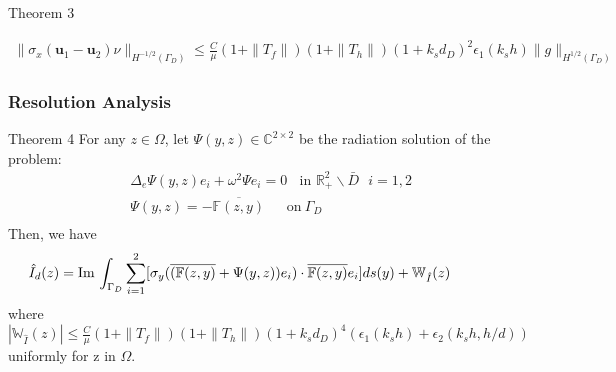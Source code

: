 \documentclass[cjk,8pt]{beamer}
\newcommand{\R}{\mathbb{R}}
\renewcommand{\Im}{\mathrm{Im}\,}
\newcommand{\Ga}{\Gamma}
\newcommand{\Om}{\Omega}
\newcommand{\bks}{\backslash}
\renewcommand{\u}{\mathbf{u}}
\newcommand{\C}{{\mathbb{C}}}
\renewcommand{\Im}{\mathrm{Im}\,}
\newcommand{\F}{\mathbb{F}}
\newcommand{\W}{\mathbb{W}}
\newcommand{\be}{\begin{eqnarray}}
\newcommand{\ee}{\end{eqnarray}}
\newcommand{\ben}{\begin{eqnarray*}}
\newcommand{\een}{\end{eqnarray*}}
\begin{document}
\begin{CJK*}{GBK}{kai}
\begin{frame}
\begin{block}{Theorem 3}
    \begin{small}
	\ben
	\|\sigma_x(\u_1-\u_2)\nu\|_{H^{-1/2}(\Gamma_D)}
	\leq \frac{C}{\mu}(1+\|T_f\|)(1+\|T_h\|)(1+k_s d_D)^2\epsilon_1(k_s h)\|g\|_{ H^{1/2}(\Ga_D)}
	\een
    \end{small}
\end{block}

\end{frame}

\begin{frame}
\frametitle{Resolution Analysis}
\begin{block}{Theorem 4}
	For any $z\in\Omega$, let $\Psi(y,z)\in\C^{2\times2}$ be the radiation solution of the problem:
	\ben
	& & \Delta_e \Psi(y,z)e_i + \omega^2\Psi e_i= 0 \ \ \ \ \mbox{in }\R_+^2\bks \bar{D} \ \ \ i=1,2 \\
	& &\Psi(y,z)= -\overline{\F(z,y)} \ \ \ \ \ \ \ \mbox{on} \ \Ga_D  \\
	\een
	Then, we have
	\be\hspace{-1cm}
	\hat{I}_d(z)=\Im\int_{\Gamma_D}\sum_{i=1}^2[\sigma_y (\overline{(\F(z,y)}+\Psi(y,z))e_i)\cdot \overline{\F(z,y)}e_i]ds(y)+\W_{\hat{I}}(z)
	\ee
	where $|\W_{\hat{I}}(z)|\leq \frac{C}{\mu}(1+\|T_f\|)(1+\|T_h\|)(1+k_s d_D)^4(\epsilon_1(k_s h)+\epsilon_2(k_s h,h/d))$ uniformly for z in $\Om$.
\end{block}
\end{frame}


\end{CJK*}
\end{document}
